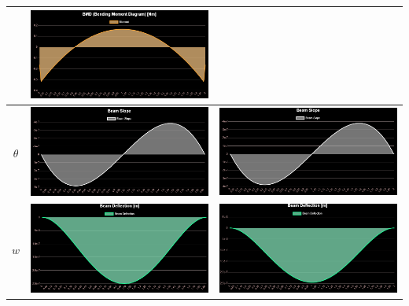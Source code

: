 \documentclass{jsarticle}
\begin{document}
\begin{table}[H]
\begin{center}
\begin{tabular}{|c|c|c|}
\begin{minipage}{6truecm}
\end{minipage}
&
\begin{minipage}{6truecm}
\centering
\includegraphics[width=6cm]{fixed_distributed_model_FDM_bm.PNG}
\end{minipage}
\\
\hline
$\theta$ &
\begin{minipage}{6truecm}
\centering
\includegraphics[width=6cm]{fixed_distributed_model_FEM_slo.PNG}
\end{minipage}
&
\begin{minipage}{6truecm}
\centering
\includegraphics[width=6cm]{fixed_distributed_model_FDM_slo.PNG}
\end{minipage}
\\
\hline
$w$ &
\begin{minipage}{6truecm}
\centering
\includegraphics[width=6cm]{fixed_distributed_model_FEM_def.PNG}
\end{minipage}
&
\begin{minipage}{6truecm}
\centering
\includegraphics[width=6cm]{fixed_distributed_model_FDM_def.PNG}
\end{minipage}
\\
\hline
\end{tabular}
\end{center}
\end{table}
\end{document}
